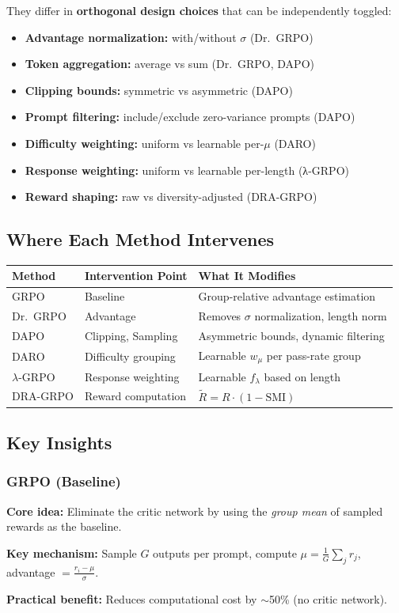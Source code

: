 \documentclass[11pt,a4paper]{article}
\begin{document}
They differ in \textbf{orthogonal design choices} that can be independently toggled:
\begin{itemize}
    \item \textbf{Advantage normalization:} with/without $\sigma$ (Dr.~GRPO)
    \item \textbf{Token aggregation:} average vs sum (Dr.~GRPO, DAPO)
    \item \textbf{Clipping bounds:} symmetric vs asymmetric (DAPO)
    \item \textbf{Prompt filtering:} include/exclude zero-variance prompts (DAPO)
    \item \textbf{Difficulty weighting:} uniform vs learnable per-$\mu$ (DARO)
    \item \textbf{Response weighting:} uniform vs learnable per-length (λ-GRPO)
    \item \textbf{Reward shaping:} raw vs diversity-adjusted (DRA-GRPO)
\end{itemize}

\subsection{Where Each Method Intervenes}

\begin{center}
\begin{tabular}{@{}lll@{}}
\toprule
\textbf{Method} & \textbf{Intervention Point} & \textbf{What It Modifies} \\
\midrule
GRPO & Baseline & Group-relative advantage estimation \\
Dr.~GRPO & Advantage & Removes $\sigma$ normalization, length norm \\
DAPO & Clipping, Sampling & Asymmetric bounds, dynamic filtering \\
DARO & Difficulty grouping & Learnable $w_\mu$ per pass-rate group \\
$\lambda$-GRPO & Response weighting & Learnable $f_\lambda$ based on length \\
DRA-GRPO & Reward computation & $\tilde{R} = R \cdot (1 - \text{SMI})$ \\
\bottomrule
\end{tabular}
\end{center}

\subsection{Key Insights}

\subsubsection{GRPO (Baseline)}
\begin{keyinsightbox}
\textbf{Core idea:} Eliminate the critic network by using the \emph{group mean} of sampled rewards as the baseline.

\textbf{Key mechanism:} Sample $G$ outputs per prompt, compute $\mu = \frac{1}{G}\sum_j r_j$, advantage $= \frac{r_i - \mu}{\sigma}$.

\textbf{Practical benefit:} Reduces computational cost by $\sim$50\% (no critic network).
\end{keyinsightbox}
\end{document}
